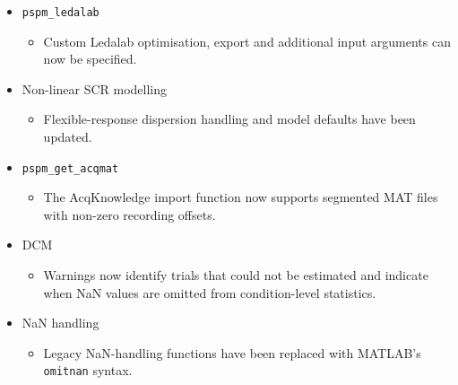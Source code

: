 \documentclass[english]{article}
\numberwithin{equation}{section}
\numberwithin{figure}{section}
\begin{document}
\begin{itemize}
\item \texttt{pspm\_ledalab}
\begin{itemize}
\item Custom Ledalab optimisation, export and additional input arguments can now be specified.
\end{itemize}

\item Non-linear SCR modelling
\begin{itemize}
\item Flexible-response dispersion handling and model defaults have been updated.
\end{itemize}

\item \texttt{pspm\_get\_acqmat}
\begin{itemize}
\item The AcqKnowledge import function now supports segmented MAT files with non-zero recording offsets.
\end{itemize}

\item DCM
\begin{itemize}
\item Warnings now identify trials that could not be estimated and indicate when NaN values are omitted from condition-level statistics.
\end{itemize}

\item NaN handling
\begin{itemize}
\item Legacy NaN-handling functions have been replaced with MATLAB's \texttt{omitnan} syntax.
\end{itemize}

\end{itemize}
\end{document}
